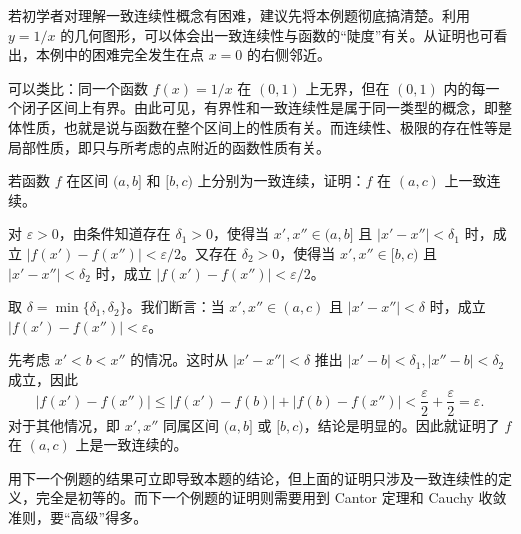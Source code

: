 \begin{xremark}
若初学者对理解一致连续性概念有困难，建议先将本例题彻底搞清楚。利用 $y=1/x$ 的几何图形，可以体会出一致连续性与函数的“陡度”有关。从证明也可看出，本例中的困难完全发生在点 $x=0$ 的右侧邻近。
\end{xremark}

\begin{xremark}
可以类比：同一个函数 $f(x)=1/x$ 在 $(0,1)$ 上无界，但在 $(0,1)$ 内的每一个闭子区间上有界。由此可见，有界性和一致连续性是属于同一类型的概念，即整体性质，也就是说与函数在整个区间上的性质有关。而连续性、极限的存在性等是局部性质，即只与所考虑的点附近的函数性质有关。
\end{xremark}

\begin{xexample}[5.4.4]
若函数 $f$ 在区间 $(a,b]$ 和 $[b,c)$ 上分别为一致连续，证明：$f$ 在 $(a,c)$ 上一致连续。
\end{xexample}
\begin{xproof}
对 $\varepsilon>0$，由条件知道存在 $\delta_1>0$，使得当 $x',x''\in(a,b]$ 且 $|x'-x''|<\delta_1$ 时，成立 $|f(x')-f(x'')|<\varepsilon/2$。又存在 $\delta_2>0$，使得当 $x',x''\in[b,c)$ 且 $|x'-x''|<\delta_2$ 时，成立 $|f(x')-f(x'')|<\varepsilon/2$。

取 $\delta=\min\{\delta_1,\delta_2\}$。我们断言：当 $x',x''\in(a,c)$ 且 $|x'-x''|<\delta$ 时，成立 $|f(x')-f(x'')|<\varepsilon$。

先考虑 $x'<b<x''$ 的情况。这时从 $|x'-x''|<\delta$ 推出 $|x'-b|<\delta_1,|x''-b|<\delta_2$ 成立，因此
\[
  |f(x')-f(x'')|\le|f(x')-f(b)|+|f(b)-f(x'')|<\frac\varepsilon2+\frac\varepsilon2=\varepsilon.
\]
对于其他情况，即 $x',x''$ 同属区间 $(a,b]$ 或 $[b,c)$，结论是明显的。因此就证明了 $f$ 在 $(a,c)$ 上是一致连续的。
\end{xproof}

\begin{xremark}
用下一个例题的结果可立即导致本题的结论，但上面的证明只涉及一致连续性的定义，完全是初等的。而下一个例题的证明则需要用到 Cantor 定理和 Cauchy 收敛准则，要“高级”得多。
\end{xremark}

